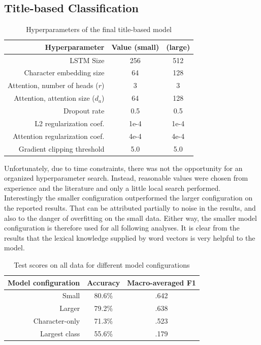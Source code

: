 \documentclass[letterpaper]{article} %
\begin{document}
\subsection{Title-based Classification}

\begin{table}
  \centering
  \caption{Hyperparameters of the final title-based model}
  \begin{tabular}{r | c | c}
    Hyperparameter & Value (small) & (large) \\
    \hline
    LSTM Size & 256 & 512 \\
    Character embedding size & 64 & 128 \\
    Attention, number of heads ($r$) & 3 & 3\\
    Attention, attention size ($d_a$) & 64 & 128\\
    Dropout rate & 0.5 & 0.5 \\
    L2 regularization coef. & 1e-4 & 1e-4 \\
    Attention regularization coef. & 4e-4 & 4e-4 \\
    Gradient clipping threshold & 5.0 & 5.0 \\
  \end{tabular}
\end{table}

Unfortunately,
due to time constraints,
there was not the opportunity for an organized hyperparameter search.
Instead,
reasonable values were chosen from experience and the literature
and only a little local search performed.
Interestingly the smaller configuration outperformed the larger configuration
on the reported results.
That can be attributed partially to noise in the results,
and also to the danger of overfitting on the small data.
Either way,
the smaller model configuration is therefore used for all following analyses.
It is clear from the results that the lexical knowledge supplied by word vectors
is very helpful to the model.

\begin{table}
  \centering
  \caption{Test scores on all data for different model configurations}
  \begin{tabular}{r | c | c}
    Model configuration & Accuracy & Macro-averaged F1 \\
    \hline
    Small & 80.6\% &  .642 \\
    Larger & 79.2\% & .638 \\
    Character-only & 71.3\% & .523 \\
    Largest class & 55.6\% & .179 \\
  \end{tabular}
\end{table}
\end{document}
